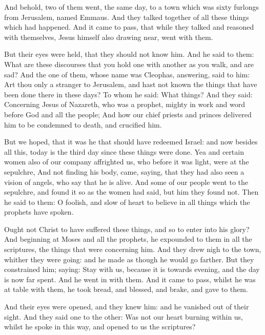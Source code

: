 \begin{quotationx}
And behold, two of them went, the same day, to a town which was sixty furlongs from Jerusalem, named Emmaus. And they talked together of all these things which had happened. And it came to pass, that while they talked and reasoned with themselves, Jesus himself also drawing near, went with them.

But their eyes were held, that they should not know him. And he said to them: What are these discourses that you hold one with another as you walk, and are sad? And the one of them, whose name was Cleophas, answering, said to him: Art thou only a stranger to Jerusalem, and hast not known the things that have been done there in these days? To whom he said: What things? And they said: Concerning Jesus of Nazareth, who was a prophet, mighty in work and word before God and all the people; And how our chief priests and princes delivered him to be condemned to death, and crucified him.

But we hoped, that it was he that should have redeemed Israel: and now besides all this, today is the third day since these things were done. Yea and certain women also of our company affrighted us, who before it was light, were at the sepulchre, And not finding his body, came, saying, that they had also seen a vision of angels, who say that he is alive. And some of our people went to the sepulchre, and found it so as the women had said, but him they found not. Then he said to them: O foolish, and slow of heart to believe in all things which the prophets have spoken.

Ought not Christ to have suffered these things, and so to enter into his glory? And beginning at Moses and all the prophets, he expounded to them in all the scriptures, the things that were concerning him. And they drew nigh to the town, whither they were going: and he made as though he would go farther. But they constrained him; saying: Stay with us, because it is towards evening, and the day is now far spent. And he went in with them. And it came to pass, whilst he was at table with them, he took bread, and blessed, and brake, and gave to them.

And their eyes were opened, and they knew him: and he vanished out of their sight. And they said one to the other: Was not our heart burning within us, whilst he spoke in this way, and opened to us the scriptures?
\end{quotationx}


